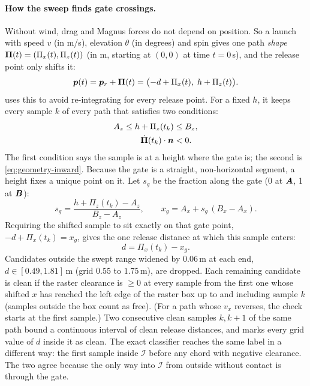 \paragraph{How the sweep finds gate crossings.} Without wind, drag and Magnus forces do not depend
on position. So a launch with speed $v$ (in \unit{m/s}), elevation $\theta$ (in degrees) and spin
gives one path \emph{shape} $\bm{\Pi}(t) = (\Pi_x(t), \Pi_z(t))$ (in \unit{m}, starting at
$(0,0)$ at time $t = 0$\,\unit{s}), and the release point only shifts it:
\begin{equation}
  \bm{p}(t) = \bm{p}_r + \bm{\Pi}(t) = \bigl(-d + \Pi_x(t),\; h + \Pi_z(t)\bigr).
  \label{eq:geometry-translate}
\end{equation}
 uses this to avoid re-integrating for every release point. For a fixed $h$,
it keeps every sample $k$ of every path that satisfies two conditions:
\begin{align}
  A_z \le h + \Pi_z(t_k) &\le B_z, \label{eq:geometry-band}\\
  \dot{\bm{\Pi}}(t_k)\cdot\bm{n} &< 0. \label{eq:geometry-band-inward}
\end{align}
The first condition says the sample is at a height where the gate is; the second is
\eqref{eq:geometry-inward}. Because the gate is a straight, non-horizontal segment, a height fixes a
unique point on it. Let $s_g$ be the fraction along the gate (0 at $\bm{A}$, 1 at $\bm{B}$):
\begin{equation}
  s_g = \frac{h + \Pi_z(t_k) - A_z}{B_z - A_z}, \qquad
  x_g = A_x + s_g\,(B_x - A_x).
  \label{eq:geometry-gate-fraction}
\end{equation}
Requiring the shifted sample to sit exactly on that gate point, $-d + \Pi_x(t_k) = x_g$, gives the
one release distance at which this sample enters:
\begin{equation}
  d = \Pi_x(t_k) - x_g .
  \label{eq:geometry-d-from-gate}
\end{equation}
Candidates outside the swept range widened by $0.06$\,\unit{m}\assumed{} at each end,
$d \in [0.49, 1.81]$\,\unit{m}\derived{} (grid $0.55$ to $1.75$\,\unit{m}\assumed), are dropped. Each
remaining candidate is clean if the raster clearance is $\ge 0$ at every sample from the first one
whose shifted $x$ has reached the left edge of the raster box up to and including sample $k$
(samples outside the box count as free). (For a path whose $v_x$ reverses, the check
starts at the first sample.) Two consecutive clean samples $k, k+1$ of the same path bound a
continuous interval of clean release distances, and  marks every grid
value of $d$ inside it as clean. The exact classifier reaches the same label in a different way:
the first sample inside $\mathcal{I}$ before any chord with negative clearance. The two agree
because the only way into $\mathcal{I}$ from outside without contact is through the gate.

